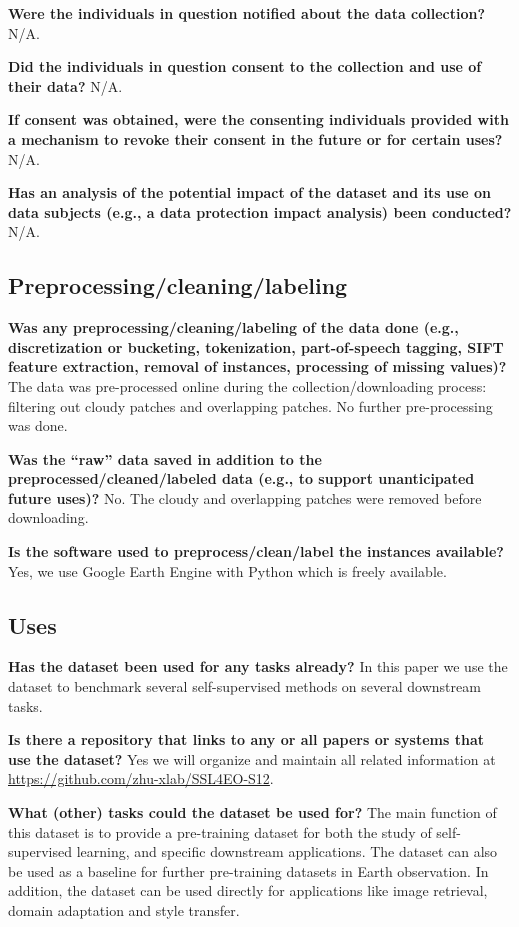 \documentclass[lettersize,journal]{IEEEtran}
\begin{document}
\textbf{Were the individuals in question notified about the data collection?} N/A.

\textbf{Did the individuals in question consent to the collection and use of their data?} N/A.

\textbf{If consent was obtained, were the consenting individuals provided with a mechanism to revoke their consent in the future or for certain uses?} N/A.

\textbf{Has an analysis of the potential impact of the dataset and its use on data subjects (e.g., a data protection impact analysis) been conducted?} N/A.

\subsection{Preprocessing/cleaning/labeling} 

\textbf{Was any preprocessing/cleaning/labeling of the data done (e.g., discretization or bucketing, tokenization, part-of-speech tagging, SIFT feature extraction, removal of instances, processing of missing values)?} The data was pre-processed online during the collection/downloading process: filtering out cloudy patches and overlapping patches. No further pre-processing was done.

\textbf{Was the “raw” data saved in addition to the preprocessed/cleaned/labeled data (e.g., to support unanticipated future uses)?} No. The cloudy and overlapping patches were removed before downloading.

\textbf{Is the software used to preprocess/clean/label the instances available?} Yes, we use Google Earth Engine with Python which is freely available.

\subsection{Uses}

\textbf{Has the dataset been used for any tasks already?} In this paper we use the dataset to benchmark several self-supervised methods on several downstream tasks. 

\textbf{Is there a repository that links to any or all papers or systems that use the dataset?} Yes we will organize and maintain all related information at \url{https://github.com/zhu-xlab/SSL4EO-S12}.

\textbf{What (other) tasks could the dataset be used for?} The main function of this dataset is to provide a pre-training dataset for both the study of self-supervised learning, and specific downstream applications. The dataset can also be used as a baseline for further pre-training datasets in Earth observation. In addition, the dataset can be used directly for applications like image retrieval, domain adaptation and style transfer.
\end{document}
